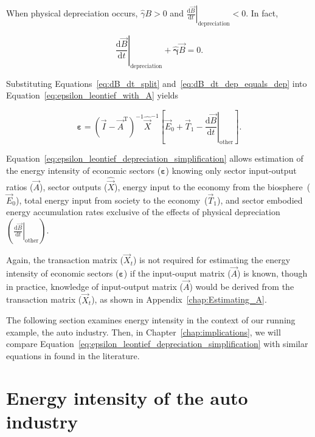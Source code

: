 \noindent{}When physical depreciation occurs,
$\hat{\gamma}B > 0$ and 
$\left. \frac{\mathrm{d}\vec{B}}{\mathrm{d}t} \right|_{\mathrm{depreciation}} < 0$.
In fact,

\begin{equation} \label{eq:dB_dt_dep_equals_dep}
	\left. \frac{\mathrm{d}\vec{B}}{\mathrm{d}t} \right|_{\mathrm{depreciation}} 
	+ \hat{\bm{\gamma}}\vec{B}
	= 0.
\end{equation}

\noindent{}Substituting Equations~\ref{eq:dB_dt_split} and~\ref{eq:dB_dt_dep_equals_dep}
into Equation~\ref{eq:epsilon_leontief_with_A} yields

\begin{equation} \label{eq:epsilon_leontief_depreciation_simplification}
	\bm{\varepsilon} 
	= {(\vec{I} - \vec{A}^{\mathrm{T}})}^{-1}\hat{\vec{X}}^{-1}
		\left[\vec{E}_{0} 
				+ \vec{T}_{1} 
				- \left. \frac{\mathrm{d}\vec{B}}{\mathrm{d}t} \right|_{\mathrm{other}}
		\right].
\end{equation}

\noindent{}Equation~\ref{eq:epsilon_leontief_depreciation_simplification} 
allows estimation of the energy intensity 
of economic sectors ($\bm{\varepsilon}$) 
knowing only 
sector input-output ratios ($\vec{A}$), 
sector outputs ($\hat{\vec{X}}$), 
energy input to the economy from the biosphere~($\vec{E}_{0}$), 
total energy input from society to the economy~($\vec{T}_{1}$), and
sector embodied energy accumulation rates
exclusive of the effects of physical
depreciation~$\left( \left. \frac{\mathrm{d}\vec{B}}{\mathrm{d}t} \right|_{\mathrm{other}} \right)$.

Again, the transaction matrix ($\vec{X}_{t}$) 
is not required for estimating the energy intensity 
of economic sectors ($\bm{\varepsilon}$)
if the input-ouput matrix ($\vec{A}$) is known, 
though in practice, 
knowledge of input-output matrix ($\vec{A}$) 
would be derived from the transaction matrix ($\vec{X}_{t}$),
as shown in Appendix~\ref{chap:Estimating_A}.

The following section examines energy intensity 
in the context of our running example, the auto industry.
Then, in Chapter~\ref{chap:implications}, we will compare
Equation~\ref{eq:epsilon_leontief_depreciation_simplification}
with similar equations in found in the literature.


\section{Energy intensity of the auto industry}
\label{sec:intensity_auto}

